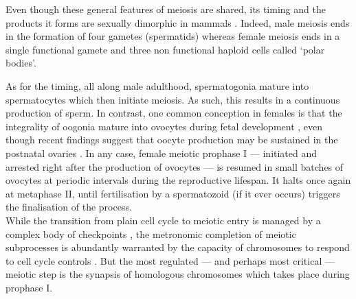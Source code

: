 


Even though these general features of meiosis are shared, its timing and the products it forms are sexually dimorphic in mammals \citep[reviewed in][]{handel2010genetics}. 
Indeed, male meiosis ends in the formation of four gametes (spermatids) whereas female meiosis ends in a single functional gamete and three non functional haploid cells called ‘polar bodies’.

As for the timing, all along male adulthood, spermatogonia mature into spermatocytes which then initiate meiosis. As such, this results in a continuous production of sperm.
In contrast, one common conception in females is that the integrality of oogonia mature into ovocytes during fetal development \citep{pearl1921studies,zuckerman1951number}, even though recent findings suggest that oocyte production may be sustained in the postnatal ovaries \citep{johnson2004germline,johnson2005oocyte}.
In any case, female meiotic prophase I — initiated and arrested right after the production of ovocytes — is resumed in small batches of ovocytes at periodic intervals during the reproductive lifespan.
It halts once again at metaphase II, until fertilisation by a spermatozoid (if it ever occurs) triggers the finalisation of the process.\\

While the transition from plain cell cycle to meiotic entry is managed by a complex body of checkpoints \citep[reviewed in][]{marston2005meiosis}, the metronomic completion of meiotic subprocesses is abundantly warranted by the capacity of chromosomes to respond to cell cycle controls \citep[reviewed in][]{mckim1995chromosomal}.
But the most regulated — and perhaps most critical — meiotic step is the synapsis of homologous chromosomes which takes place during prophase I.



